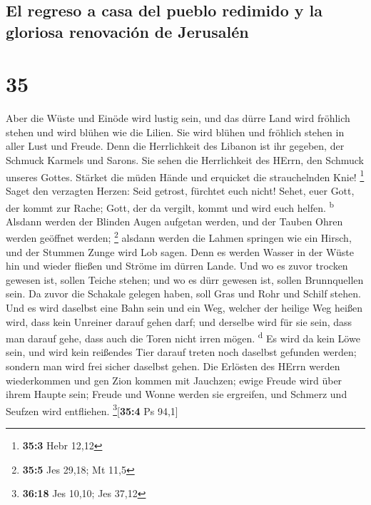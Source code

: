 \hypertarget{el-regreso-a-casa-del-pueblo-redimido-y-la-gloriosa-renovaciuxf3n-de-jerusaluxe9n}{%
\subsection{El regreso a casa del pueblo redimido y la gloriosa
renovación de
Jerusalén}\label{el-regreso-a-casa-del-pueblo-redimido-y-la-gloriosa-renovaciuxf3n-de-jerusaluxe9n}}

\hypertarget{section-34}{%
\section{35}\label{section-34}}

 Aber die Wüste und Einöde wird lustig sein, und das dürre
Land wird fröhlich stehen und wird blühen wie die Lilien. 
Sie wird blühen und fröhlich stehen in aller Lust und Freude. Denn die
Herrlichkeit des Libanon ist ihr gegeben, der Schmuck Karmels und
Sarons. Sie sehen die Herrlichkeit des HErrn, den Schmuck unseres
Gottes.  Stärket die müden Hände und erquicket die
strauchelnden Knie! \footnote{\textbf{35:3} Hebr 12,12} 
Saget den verzagten Herzen: Seid getrost, fürchtet euch nicht! Sehet,
euer Gott, der kommt zur Rache; Gott, der da vergilt, kommt und wird
euch helfen. \textsuperscript{b}  Alsdann werden der
Blinden Augen aufgetan werden, und der Tauben Ohren werden geöffnet
werden; \footnote{\textbf{35:5} Jes 29,18; Mt 11,5} 
alsdann werden die Lahmen springen wie ein Hirsch, und der Stummen Zunge
wird Lob sagen. Denn es werden Wasser in der Wüste hin und wieder
fließen und Ströme im dürren Lande.  Und wo es zuvor
trocken gewesen ist, sollen Teiche stehen; und wo es dürr gewesen ist,
sollen Brunnquellen sein. Da zuvor die Schakale gelegen haben, soll Gras
und Rohr und Schilf stehen.  Und es wird daselbst eine
Bahn sein und ein Weg, welcher der heilige Weg heißen wird, dass kein
Unreiner darauf gehen darf; und derselbe wird für sie sein, dass man
darauf gehe, dass auch die Toren nicht irren mögen. \textsuperscript{d}
 Es wird da kein Löwe sein, und wird kein reißendes Tier
darauf treten noch daselbst gefunden werden; sondern man wird frei
sicher daselbst gehen.  Die Erlösten des HErrn werden
wiederkommen und gen Zion kommen mit Jauchzen; ewige Freude wird über
ihrem Haupte sein; Freude und Wonne werden sie ergreifen, und Schmerz
und Seufzen wird entfliehen. \footnote{\textbf{36:18} Jes 10,10; Jes
  37,12}{[}\textbf{35:4} Ps 94,1{]}

